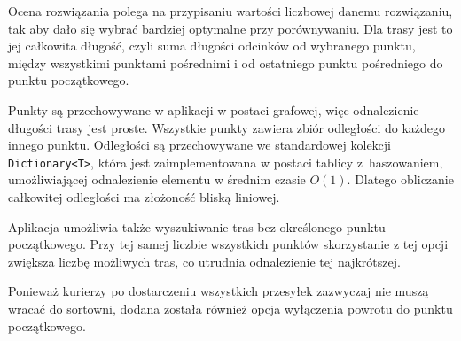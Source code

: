 Ocena rozwiązania polega na przypisaniu wartości liczbowej danemu rozwiązaniu, tak aby dało się wybrać bardziej optymalne przy porównywaniu. Dla trasy jest to jej całkowita długość, czyli suma długości odcinków od wybranego punktu, między wszystkimi punktami pośrednimi i od ostatniego punktu pośredniego do punktu początkowego.

Punkty są przechowywane w aplikacji w postaci grafowej, więc odnalezienie długości trasy jest proste. Wszystkie punkty zawiera zbiór odległości do każdego innego punktu. Odległości są przechowywane we standardowej kolekcji \texttt{Dictionary<T>}, która jest zaimplementowana w postaci tablicy z~haszowaniem, umożliwiającej odnalezienie elementu w średnim czasie $O(1)$. Dlatego obliczanie całkowitej odległości ma złożoność bliską liniowej.

Aplikacja umożliwia także wyszukiwanie tras bez określonego punktu początkowego. Przy tej samej liczbie wszystkich punktów skorzystanie z tej opcji zwiększa liczbę możliwych tras, co utrudnia odnalezienie tej najkrótszej. 

Ponieważ kurierzy po dostarczeniu wszystkich przesyłek zazwyczaj nie muszą wracać do sortowni, dodana została również opcja wyłączenia powrotu do punktu początkowego. 